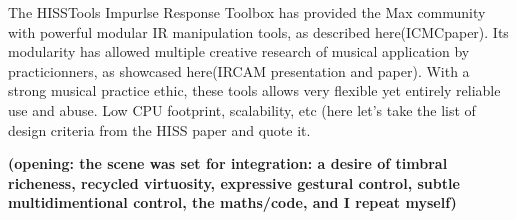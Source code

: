 The HISSTools Impurlse Response Toolbox has provided the Max community with powerful modular IR manipulation tools, as described here(ICMCpaper). Its modularity has allowed multiple creative research of musical application by practicionners, as showcased here(IRCAM presentation and paper). With a strong musical practice ethic, these tools allows very flexible yet entirely reliable use and abuse. Low CPU footprint, scalability, etc (here let's take the list of design criteria from the HISS paper and quote it.

\textbf{(opening: the scene was set for integration: a desire of timbral richeness, recycled virtuosity, expressive gestural control, subtle multidimentional control, the maths/code, and I repeat myself)}
